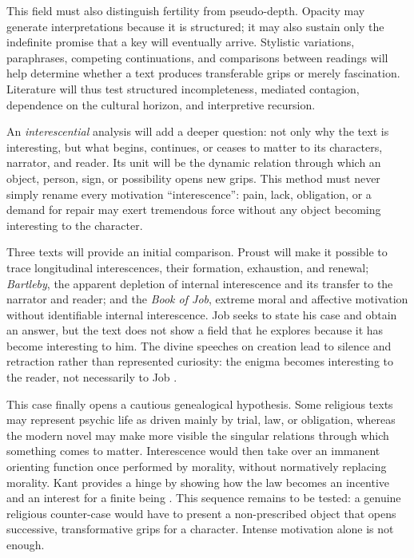\documentclass[11pt,a4paper]{article}
\begin{document}
This field must also distinguish fertility from pseudo-depth. Opacity may
generate interpretations because it is structured; it may also sustain only the
indefinite promise that a key will eventually arrive. Stylistic variations,
paraphrases, competing continuations, and comparisons between readings will
help determine whether a text produces transferable grips or merely
fascination. Literature will thus test structured incompleteness, mediated
contagion, dependence on the cultural horizon, and interpretive recursion.

An \emph{interescential} analysis will add a deeper question: not only why the
text is interesting, but what begins, continues, or ceases to matter to its
characters, narrator, and reader. Its unit will be the dynamic relation through
which an object, person, sign, or possibility opens new grips. This method must
never simply rename every motivation ``interescence'': pain, lack, obligation,
or a demand for repair may exert tremendous force without any object becoming
interesting to the character.

Three texts will provide an initial comparison. Proust will make it possible to
trace longitudinal interescences, their formation, exhaustion, and renewal;
\emph{Bartleby}, the apparent depletion of internal interescence and its
transfer to the narrator and reader; and the \emph{Book of Job}, extreme moral
and affective motivation without identifiable internal interescence. Job seeks
to state his case and obtain an answer, but the text does not show a field that
he explores because it has become interesting to him. The divine speeches on
creation lead to silence and retraction rather than represented curiosity: the
enigma becomes interesting to the reader, not necessarily to Job
\parencite{jps1985tanakh}.

This case finally opens a cautious genealogical hypothesis. Some religious
texts may represent psychic life as driven mainly by trial, law, or obligation,
whereas the modern novel may make more visible the singular relations through
which something comes to matter. Interescence would then take over an immanent
orienting function once performed by morality, without normatively replacing
morality. Kant provides a hinge by showing how the law becomes an incentive and
an interest for a finite being \parencite{kant1848moralepratique}. This sequence
remains to be tested: a genuine religious counter-case would have to present a
non-prescribed object that opens successive, transformative grips for a
character. Intense motivation alone is not enough.
\end{document}
